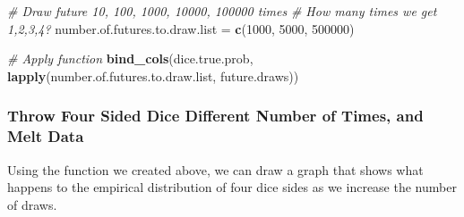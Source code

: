 \documentclass[
]{book}
\newenvironment{Shaded}{\begin{snugshade}}{\end{snugshade}}
\newcommand{\CommentTok}[1]{\textcolor[rgb]{0.56,0.35,0.01}{\textit{#1}}}
\newcommand{\DecValTok}[1]{\textcolor[rgb]{0.00,0.00,0.81}{#1}}
\newcommand{\KeywordTok}[1]{\textcolor[rgb]{0.13,0.29,0.53}{\textbf{#1}}}
\newcommand{\NormalTok}[1]{#1}
\newcommand{\StringTok}[1]{\textcolor[rgb]{0.31,0.60,0.02}{#1}}
\begin{document}
\begin{Shaded}
\begin{Highlighting}[]
\CommentTok{\# Draw future 10, 100, 1000, 10000, 100000 times}
\CommentTok{\# How many times we get 1,2,3,4?}
\NormalTok{number.of.futures.to.draw.list =}\StringTok{ }\KeywordTok{c}\NormalTok{(}\DecValTok{1000}\NormalTok{, }\DecValTok{5000}\NormalTok{, }\DecValTok{500000}\NormalTok{)}

\CommentTok{\# Apply function}
\KeywordTok{bind\_cols}\NormalTok{(dice.true.prob, }\KeywordTok{lapply}\NormalTok{(number.of.futures.to.draw.list, future.draws))}
\end{Highlighting}
\end{Shaded}

\hypertarget{throw-four-sided-dice-different-number-of-times-and-melt-data}{%
\subsubsection{Throw Four Sided Dice Different Number of Times, and Melt Data}\label{throw-four-sided-dice-different-number-of-times-and-melt-data}}

Using the function we created above, we can draw a graph that shows what happens to the empirical distribution of four dice sides as we increase the number of draws.
\end{document}
